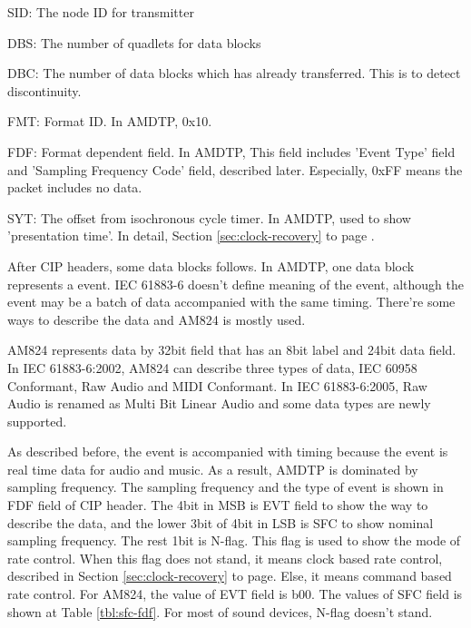 \documentclass[onecolumn]{article}
\begin{document}
\begin{description}
\item{SID:} The node ID for transmitter
\item{DBS:} The number of quadlets for data blocks
\item{DBC:} The number of data blocks which has already transferred. This is to detect discontinuity.
\item{FMT:} Format ID. In AMDTP, 0x10.
\item{FDF:} Format dependent field. In AMDTP, This field includes 'Event Type' field and 'Sampling Frequency Code' field, described later. Especially, 0xFF means the packet includes no data. 
\item{SYT:} The offset from isochronous cycle timer. In AMDTP, used to show 'presentation time'. In detail, Section \ref{sec:clock-recovery} to page \pageref{sec:clock-recovery}.
\end{description}

After CIP headers, some data blocks follows. In AMDTP, one data block represents a event. IEC 61883-6\cite{iec61883-6-1, iec61883-6-2} doesn't define meaning of the event, although the event may be a batch of data accompanied with the same timing. There're some ways to describe the data and AM824 is mostly used.

AM824 represents data by 32bit field that has an 8bit label and 24bit data field\cite{iec61883-6-2}. In IEC 61883-6:2002\cite{iec61883-6-1}, AM824 can describe three types of data, IEC 60958 Conformant, Raw Audio and MIDI Conformant. In IEC 61883-6:2005\cite{iec61883-6-2}, Raw Audio is renamed as Multi Bit Linear Audio and some data types are newly supported.

As described before, the event is accompanied with timing because the event is real time data for audio and music. As a result, AMDTP is dominated by sampling frequency. The sampling frequency and the type of event is shown in FDF field of CIP header. The 4bit in MSB is EVT field to show the way to describe the data, and the lower 3bit of 4bit in LSB is SFC to show nominal sampling frequency. The rest 1bit is N-flag. This flag is used to show the mode of rate control. When this flag does not stand, it means clock based rate control, described in Section \ref{sec:clock-recovery} to page\pageref{sec:clock-recovery}. Else, it means command based rate control\cite{iec61883-6-2, avc-rate-control}. For AM824, the value of EVT field is b00. The values of SFC field is shown at Table \ref{tbl:sfc-fdf}. For most of sound devices, N-flag doesn't stand.
\end{document}
